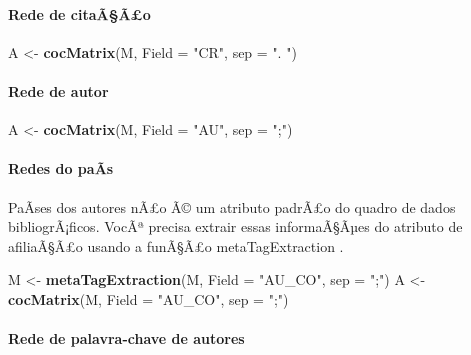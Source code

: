\documentclass[]{article}
\newenvironment{Shaded}{\begin{snugshade}}{\end{snugshade}}
\newcommand{\KeywordTok}[1]{\textcolor[rgb]{0.13,0.29,0.53}{\textbf{#1}}}
\newcommand{\DataTypeTok}[1]{\textcolor[rgb]{0.13,0.29,0.53}{#1}}
\newcommand{\StringTok}[1]{\textcolor[rgb]{0.31,0.60,0.02}{#1}}
\newcommand{\NormalTok}[1]{#1}
\let\oldparagraph\paragraph
\renewcommand{\paragraph}[1]{\oldparagraph{#1}\mbox{}}
\begin{document}
\paragraph{Rede de citaÃ§Ã£o}\label{rede-de-citaaao}

\begin{Shaded}
\begin{Highlighting}[]
\NormalTok{A <-}\StringTok{ }\KeywordTok{cocMatrix}\NormalTok{(M, }\DataTypeTok{Field =} \StringTok{"CR"}\NormalTok{, }\DataTypeTok{sep =} \StringTok{".  "}\NormalTok{)}
\end{Highlighting}
\end{Shaded}

\paragraph{Rede de autor}\label{rede-de-autor}

\begin{Shaded}
\begin{Highlighting}[]
\NormalTok{A <-}\StringTok{ }\KeywordTok{cocMatrix}\NormalTok{(M, }\DataTypeTok{Field =} \StringTok{"AU"}\NormalTok{, }\DataTypeTok{sep =} \StringTok{";"}\NormalTok{)}
\end{Highlighting}
\end{Shaded}

\paragraph{Redes do paÃ­s}\label{redes-do-paas}

PaÃ­ses dos autores nÃ£o Ã© um atributo padrÃ£o do quadro de dados
bibliogrÃ¡ficos. VocÃª precisa extrair essas informaÃ§Ãµes do atributo
de afiliaÃ§Ã£o usando a funÃ§Ã£o metaTagExtraction .

\begin{Shaded}
\begin{Highlighting}[]
\NormalTok{M <-}\StringTok{ }\KeywordTok{metaTagExtraction}\NormalTok{(M, }\DataTypeTok{Field =} \StringTok{"AU_CO"}\NormalTok{, }\DataTypeTok{sep =} \StringTok{";"}\NormalTok{)}
\NormalTok{A <-}\StringTok{ }\KeywordTok{cocMatrix}\NormalTok{(M, }\DataTypeTok{Field =} \StringTok{"AU_CO"}\NormalTok{, }\DataTypeTok{sep =} \StringTok{";"}\NormalTok{)}
\end{Highlighting}
\end{Shaded}

\paragraph{Rede de palavra-chave de
autores}\label{rede-de-palavra-chave-de-autores}
\end{document}
